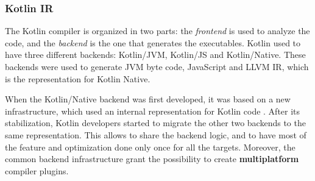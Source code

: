 \subsubsection{Kotlin IR}\label{section:kotlin_ir}
The Kotlin compiler is organized in two parts: the \textit{frontend} is used to analyze the code, and the \textit{backend} is the one that generates the executables.\newline
Kotlin used to have three different backends: Kotlin/JVM, Kotlin/JS and Kotlin/Native. These backends were used to generate JVM byte code, JavaScript and LLVM IR, which is the representation for Kotlin Native.

When the Kotlin/Native backend was first developed, it was based on a new infrastructure, which used an internal representation for Kotlin code \cite{kotlin_ir_stabilization}. After its stabilization, Kotlin developers started to migrate the other two backends to the same representation. This allows to share the backend logic, and to have most of the feature and optimization done only once for all the targets. Moreover, the common backend infrastructure grant the possibility to create \textbf{multiplatform} compiler plugins.

